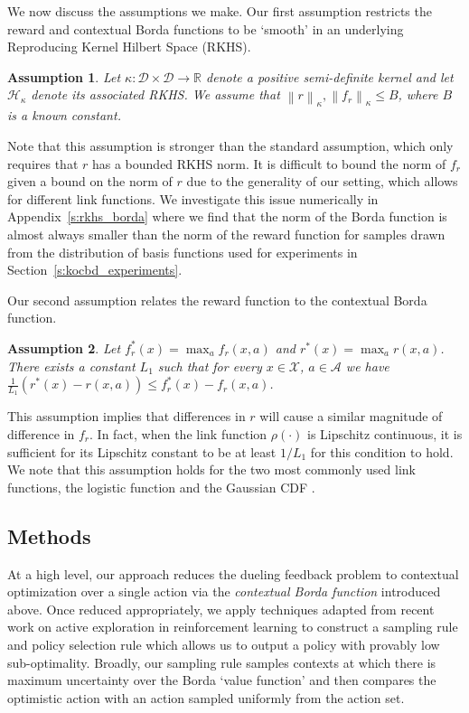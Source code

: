 \documentclass{article} \usepackage{iclr2023_conference,times}
\newcommand{\Rbb}{\mathbb{R}}
\newcommand{\Contextspace}{\mathcal{X}}
\newcommand{\Actionspace}{\mathcal{A}}
\newcommand{\kernel}{\kappa}
\newcommand{\borda}{f_r}
\newcommand{\RKHS}{\mathcal{H}}
\newcommand{\Domain}{\mathcal{D}}
\newcommand{\add}[1]{#1}
\newcommand{\linkfunction}{\add{\rho}}
\newtheorem{assumption}{Assumption}
\begin{document}
We now discuss the assumptions we make.
Our first assumption restricts the reward and contextual Borda functions to be `smooth' in an underlying Reproducing Kernel Hilbert Space (RKHS).
\begin{assumption}\label{ass:norm}
    Let $\kernel: \Domain \times \Domain \to \Rbb$ denote a positive semi-definite kernel and let $\RKHS_\kernel$ denote its associated RKHS. We assume that $ \left \lVert r \right \rVert_{\kernel}, \left \lVert \borda \right \rVert_{\kernel} \leq B$, where $B$ is a known constant.
\end{assumption}
Note that this assumption is stronger than the standard assumption, which only requires that $r$ has a bounded RKHS norm.
It is difficult to bound the norm of $f_r$ given a bound on the norm of $r$ due to the generality of our setting, which allows for different link functions.
We investigate this issue numerically in Appendix~\ref{s:rkhs_borda} where we find that the norm of the Borda function is almost always smaller than the norm of the reward function for samples drawn from the distribution of basis functions used for experiments in Section~\ref{s:kocbd_experiments}.

Our second assumption relates the reward function to the contextual Borda function.
\begin{assumption}
    \label{ass:borda}
    Let $\borda^*(x) = \max_a \borda(x, a)$ and $r^*(x) = \max_a r(x, a)$. There exists a constant $L_1$ such that for every $x \in \Contextspace$, $a \in \Actionspace$ we have $\frac{1}{L_1}(r^*(x) - r(x, a)) \leq \borda^*(x) - \borda(x, a)$.
\end{assumption}
This assumption implies that differences in $r$ will cause a similar magnitude of difference in $f_r$. In fact, when the link function $\linkfunction(\cdot)$ is Lipschitz continuous, it is sufficient for its Lipschitz constant to be at least $1/L_1$ for this condition to hold. \add{We note that this assumption holds for the two most commonly used link functions, the logistic function \citep{bradley1952rank} and the Gaussian CDF \citep{thurstone1927method}.}

\subsection{Methods} \label{s:kocbd_methods}

At a high level, our approach reduces the dueling feedback problem to contextual optimization over a single action via the \emph{contextual Borda function} introduced above.
Once reduced appropriately, we apply techniques adapted from recent work on active exploration in reinforcement learning to construct a sampling rule and policy selection rule which allows us to output a policy with provably low sub-optimality.
Broadly, our sampling rule samples contexts at which there is maximum uncertainty over the Borda `value function' and then compares the optimistic action with an action sampled uniformly from the action set.
\end{document}
